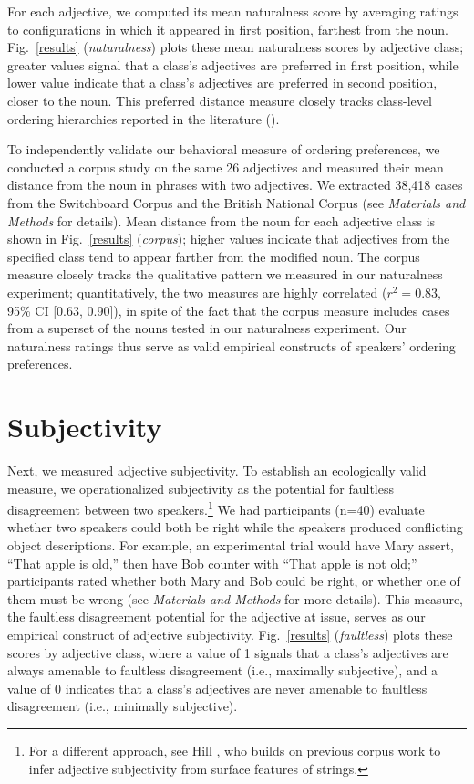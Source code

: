\documentclass{pnastwo}
\begin{document}
\begin{article}
For each adjective, we computed its mean naturalness score by averaging ratings to configurations in which it appeared in first position, farthest from the noun. Fig.\ \ref{results} (\emph{naturalness}) plots these mean naturalness scores by adjective class; greater values signal that a class's adjectives are preferred in first position, while lower value indicate that a class's adjectives are preferred in second position, closer to the noun. This preferred distance measure closely tracks class-level ordering hierarchies reported in the literature (\cite{dixon1982,sproatshih1991}).

To independently validate our behavioral measure of ordering preferences, we conducted a corpus study on the same 26 adjectives and measured their mean distance from the noun in phrases with two adjectives. We extracted 38,418 cases from the Switchboard Corpus and the British National Corpus (see \emph{Materials and Methods} for details). Mean distance from the noun for each adjective class is shown in Fig.~\ref{results} (\emph{corpus}); higher values indicate that adjectives from the specified class tend to appear farther from the modified noun. The corpus measure closely tracks the qualitative pattern we measured in our naturalness experiment; quantitatively, the two measures are highly correlated ($r^{2}=0.83$, 95\% CI [0.63, 0.90]), in spite of the fact that the corpus measure includes cases from a superset of the nouns tested in our naturalness experiment. Our naturalness ratings thus serve as valid empirical constructs of speakers' ordering preferences.

\section{Subjectivity}

Next, we measured adjective subjectivity. To establish an ecologically valid measure, we operationalized subjectivity as the potential for faultless disagreement between two speakers.\footnote{For a different approach, see Hill \cite{hill2012}, who builds on previous corpus work \cite{wulff2003} to infer adjective subjectivity from surface features of strings.} We had participants (n=40) evaluate whether two speakers could both be right while the speakers produced conflicting object descriptions. For example, an experimental trial would have Mary assert, ``That apple is old,'' then have Bob counter with ``That apple is not old;'' 
participants rated whether both Mary and Bob could be right, or whether one of them must be wrong (see \emph{Materials and Methods} for more details). This measure, the faultless disagreement potential for the adjective at issue, serves as our empirical construct of adjective subjectivity. Fig.\ \ref{results} (\emph{faultless}) plots these scores by adjective class, where a value of 1 signals that a class's adjectives are always amenable to faultless disagreement (i.e., maximally subjective), and a value of 0 indicates that a class's adjectives are never amenable to faultless disagreement (i.e., minimally subjective).


\end{article}
\end{document}
